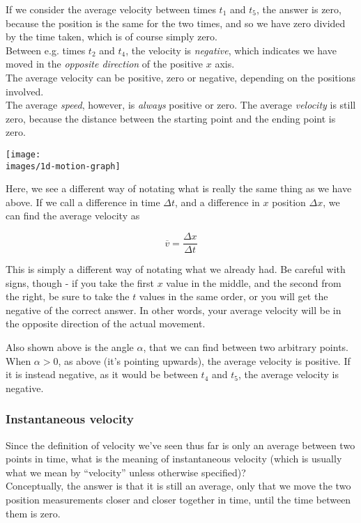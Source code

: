 If we consider the average velocity between times $t_1$ and $t_5$, the answer is zero, because the position is the same for the two times, and so we have zero divided by the time taken, which is of course simply zero.\\
Between e.g. times $t_2$ and $t_4$, the velocity is \emph{negative}, which indicates we have moved in the \emph{opposite direction} of the positive $x$ axis.\\
The average velocity can be positive, zero or negative, depending on the positions involved.\\
The average \emph{speed}, however, is \emph{always} positive or zero. The average \emph{velocity} is still zero, because the distance between the starting point and the ending point is zero.

\begin{center}
\texttt{[image: \\images/1d-motion-graph]}
\end{center}

Here, we see a different way of notating what is really the same thing as we have above. If we call a difference in time $\Delta t$, and a difference in $x$ position $\Delta x$, we can find the average velocity as

\begin{equation}
 \overbar{v} = \frac{\Delta x}{\Delta t}
\end{equation} 

This is simply a different way of notating what we already had. Be careful with signs, though - if you take the first $x$ value in the middle, and the second from the right, be sure to take the $t$ values in the same order, or you will get the negative of the correct answer. In other words, your average velocity will be in the opposite direction of the actual movement.

Also shown above is the angle $\alpha$, that we can find between two arbitrary points. When $\alpha > 0$, as above (it's pointing upwards), the average velocity is positive. If it is instead negative, as it would be between $t_4$ and $t_5$, the average velocity is negative.

\subsubsection{Instantaneous velocity}

Since the definition of velocity we've seen thus far is only an average between two points in time, what is the meaning of instantaneous velocity (which is usually what we mean by ``velocity'' unless otherwise specified)?\\
Conceptually, the answer is that it is still an average, only that we move the two position measurements closer and closer together in time, until the time between them is zero.

